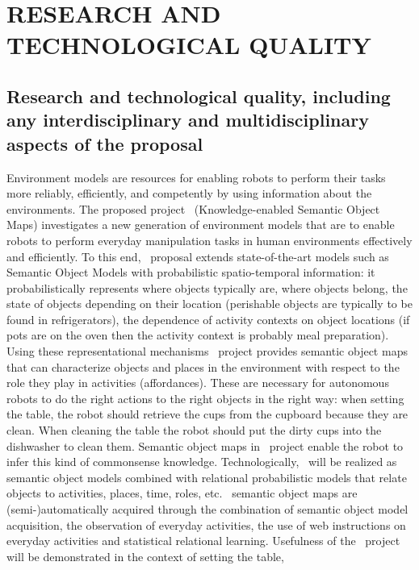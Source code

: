 \section{RESEARCH AND TECHNOLOGICAL QUALITY} %
\label{sec:quality}
\subsection{Research and technological quality, including any interdisciplinary and multidisciplinary 
aspects of the proposal}
\label{sec:q1}
Environment models are resources  for enabling robots to perform their
tasks more reliably, efficiently, and competently by using information
about the  environments. The proposed  project \ksem\ (Knowledge-enabled
Semantic Object Maps) investigates a new generation of environment models that
are to enable  robots to perform everyday manipulation  tasks in human
environments effectively and efficiently.   To this end, \ksem\ proposal
extends state-of-the-art  models such  as Semantic Object  Models with
probabilistic  spatio-temporal   information:  it  probabilistically
represents where objects typically are, where objects belong, the state
of  objects  depending  on  their  location  (perishable  objects  are
typically to  be found in  refrigerators), the dependence  of activity
contexts  on  object locations  (if  pots are  on  the  oven then  the
activity   context  is   probably  meal   preparation).   Using  these
representational mechanisms \ksem\ project provides semantic object maps that can
characterize objects and places in the environment with respect to the
role they  play in activities  (affordances). These are  necessary for
autonomous robots to do the right  actions to the right objects in the
right way: when setting the  table, the robot should retrieve the cups
from the cupboard because they  are clean. When cleaning the table the
robot  should  put  the  dirty  cups  into  the  dishwasher  to  clean
them.  Semantic object maps in \ksem\ project  enable the  robot  to  infer  this kind  of  commonsense
knowledge.   Technologically,  \ksem \ will  be realized as  semantic object  models
combined with  relational probabilistic models that  relate objects to
activities, places,  time, roles, etc.  \ksem\ semantic object maps are (semi-)automatically
acquired through the combination of semantic object model acquisition,
the observation of everyday activities, the use of web instructions on
everyday activities and statistical relational learning. Usefulness of 
the \ksem\ project will be demonstrated  in the context of  setting  the  table, 
